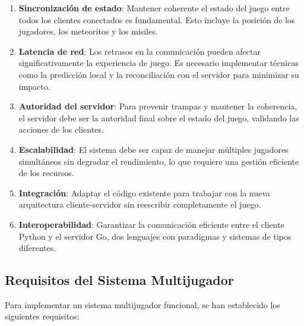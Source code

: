 \documentclass[12pt,letterpaper]{article}
\begin{document}
\begin{enumerate}
    \item \textbf{Sincronización de estado}: Mantener coherente el estado del juego entre todos los clientes conectados es fundamental. Esto incluye la posición de los jugadores, los meteoritos y los misiles.
    
    \item \textbf{Latencia de red}: Los retrasos en la comunicación pueden afectar significativamente la experiencia de juego. Es necesario implementar técnicas como la predicción local y la reconciliación con el servidor para minimizar su impacto.
    
    \item \textbf{Autoridad del servidor}: Para prevenir trampas y mantener la coherencia, el servidor debe ser la autoridad final sobre el estado del juego, validando las acciones de los clientes.
    
    \item \textbf{Escalabilidad}: El sistema debe ser capaz de manejar múltiples jugadores simultáneos sin degradar el rendimiento, lo que requiere una gestión eficiente de los recursos.
    
    \item \textbf{Integración}: Adaptar el código existente para trabajar con la nueva arquitectura cliente-servidor sin reescribir completamente el juego.
    
    \item \textbf{Interoperabilidad}: Garantizar la comunicación eficiente entre el cliente Python y el servidor Go, dos lenguajes con paradigmas y sistemas de tipos diferentes.
\end{enumerate}

\subsection{Requisitos del Sistema Multijugador}

Para implementar un sistema multijugador funcional, se han establecido los siguientes requisitos:
\end{document}
